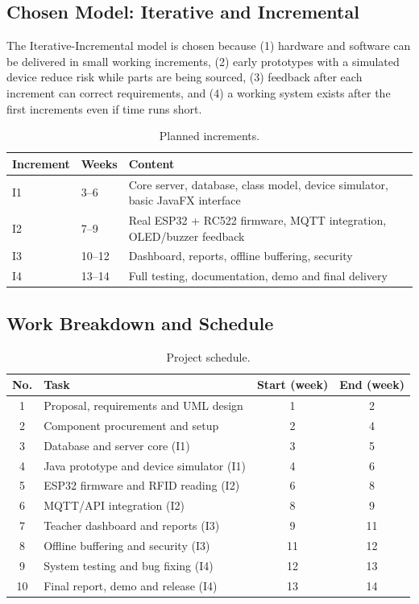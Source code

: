 \documentclass[11pt,a4paper]{article}
\begin{document}
\subsection{Chosen Model: Iterative and Incremental}
The Iterative-Incremental model is chosen because (1) hardware and software can be delivered in small working increments, (2) early prototypes with a simulated device reduce risk while parts are being sourced, (3) feedback after each increment can correct requirements, and (4) a working system exists after the first increments even if time runs short.
 
\begin{table}[H]
\centering
\small
\begin{tabular}{llp{8cm}}
\toprule
\textbf{Increment} & \textbf{Weeks} & \textbf{Content}\\
\midrule
I1 & 3--6 & Core server, database, class model, device simulator, basic JavaFX interface\\
I2 & 7--9 & Real ESP32 + RC522 firmware, MQTT integration, OLED/buzzer feedback\\
I3 & 10--12 & Dashboard, reports, offline buffering, security\\
I4 & 13--14 & Full testing, documentation, demo and final delivery\\
\bottomrule
\end{tabular}
\caption{Planned increments.}
\end{table}
 
\subsection{Work Breakdown and Schedule}
\begin{table}[H]
\centering
\small
\begin{tabular}{clcc}
\toprule
\textbf{No.} & \textbf{Task} & \textbf{Start (week)} & \textbf{End (week)}\\
\midrule
1 & Proposal, requirements and UML design & 1 & 2\\
2 & Component procurement and setup & 2 & 4\\
3 & Database and server core (I1) & 3 & 5\\
4 & Java prototype and device simulator (I1) & 4 & 6\\
5 & ESP32 firmware and RFID reading (I2) & 6 & 8\\
6 & MQTT/API integration (I2) & 8 & 9\\
7 & Teacher dashboard and reports (I3) & 9 & 11\\
8 & Offline buffering and security (I3) & 11 & 12\\
9 & System testing and bug fixing (I4) & 12 & 13\\
10 & Final report, demo and release (I4) & 13 & 14\\
\bottomrule
\end{tabular}
\caption{Project schedule.}
\end{table}
 
\end{document}
